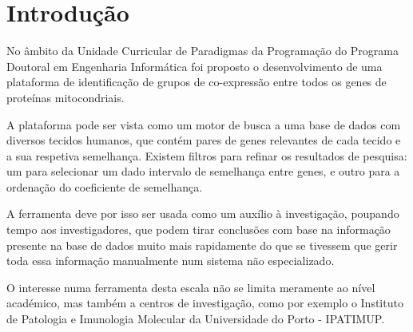 \section{Introdução}

No âmbito da Unidade Curricular de Paradigmas da Programação do Programa Doutoral em Engenharia Informática foi proposto o desenvolvimento de uma plataforma de identificação de grupos de co-expressão entre todos os genes de proteínas mitocondriais.

\bigskip

A plataforma pode ser vista como um motor de busca a uma base de dados com diversos tecidos humanos, que contém pares de genes relevantes de cada tecido e a sua respetiva semelhança. Existem filtros para refinar os resultados de pesquisa: um para selecionar um dado intervalo de semelhança entre genes, e outro para a ordenação do coeficiente de semelhança.

A ferramenta deve por isso ser usada como um auxílio à investigação, poupando tempo aos investigadores, que podem tirar conclusões com base na informação presente na base de dados muito mais rapidamente do que se tivessem que gerir toda essa informação manualmente num sistema não especializado.

\bigskip

O interesse numa ferramenta desta escala não se limita meramente ao nível académico, mas também a centros de investigação, como por exemplo o Instituto de Patologia e Imunologia Molecular da Universidade do Porto - IPATIMUP.

\newpage
